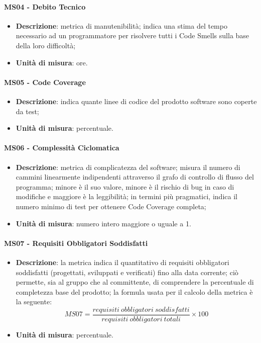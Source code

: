         \paragraph{MS04 - Debito Tecnico}
        \begin{itemize}
            \item \textbf{Descrizione}: metrica di manutenibilità; indica una stima del tempo necessario ad un programmatore per risolvere tutti i Code Smells sulla base della loro difficoltà;
            \item \textbf{Unità di misura}: ore.
        \end{itemize}

        \paragraph{MS05 - Code Coverage}
        \begin{itemize}
            \item \textbf{Descrizione}: indica quante linee di codice del prodotto software sono coperte da test;
            \item \textbf{Unità di misura}: percentuale.
        \end{itemize}

        \paragraph{MS06 - Complessità Ciclomatica}
        \begin{itemize}
            \item \textbf{Descrizione}: metrica di complicatezza del software; misura il numero di cammini linearmente indipendenti attraverso il grafo di controllo di flusso del programma; minore è il suo valore, minore è il rischio di bug in caso di modifiche e maggiore è la leggibilità; in termini più pragmatici, indica il numero minimo di test per ottenere Code Coverage completa;
            \item \textbf{Unità di misura}: numero intero maggiore o uguale a 1.
        \end{itemize}

		\paragraph{MS07 - Requisiti Obbligatori Soddisfatti}
		\begin{itemize}
			\item \textbf{Descrizione}: la metrica indica il quantitativo di requisiti obbligatori soddisfatti (progettati, sviluppati e verificati) fino alla data corrente; ciò permette, sia al gruppo che al committente, di comprendere la percentuale di completezza base del prodotto; la formula usata per il calcolo della metrica è la seguente:
            \[
            MS07 = \frac{requisiti\ obbligatori\ soddisfatti}{requisiti\ obbligatori\ totali} \times 100
            \]
			\item \textbf{Unità di misura}: percentuale.
		\end{itemize}

